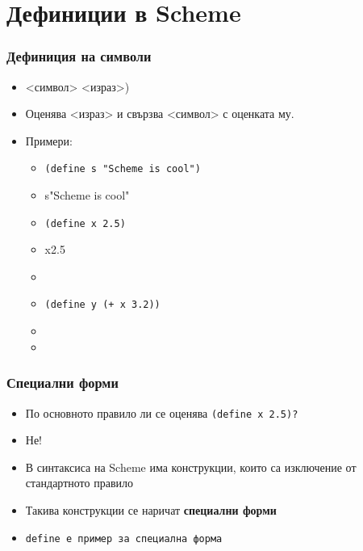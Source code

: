 \documentclass{beamer}
\begin{document}
\section{Дефиниции в Scheme}

\begin{frame}
  \frametitle{Дефиниция на символи}

  \begin{itemize}[<+->]
  \item {} <символ> <израз>\tta)
  \item Оценява <израз> и свързва <символ> с оценката му.
  \item Примери:
    \begin{itemize}
    \item \tt{(define s "Scheme is cool")}
    \item \evalsto s{"Scheme is cool"}
    \item \tt{(define x 2.5)}
    \item \evalsto x{2.5}
    \item {}
    \item \tt{(define y (+ x 3.2))}
    \item {}
    \item {}
    \end{itemize}
  \end{itemize}
\end{frame}

\begin{frame}
  \frametitle{Специални форми}

  \begin{itemize}[<+->]
  \item По основното правило ли се оценява \tt{(define x 2.5)}?
  \item \alert{Не!}
  \item В синтаксиса на Scheme има конструкции, които са изключение от стандартното правило
  \item Такива конструкции се наричат \textbf{специални форми}
  \item \tt{define} е пример за специална форма
  \end{itemize}
\end{frame}
\end{document}
